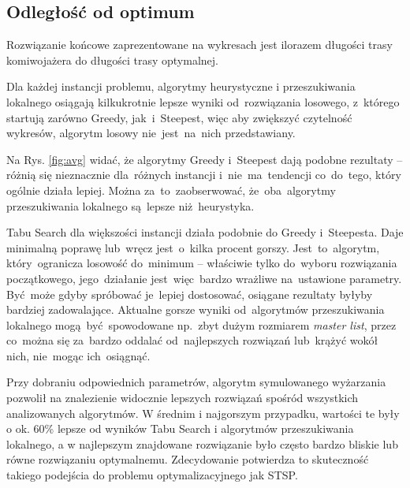 \subsection{Odległość od optimum}

{\color{part2}
Rozwiązanie końcowe zaprezentowane na wykresach jest ilorazem długości trasy komiwojażera do długości trasy optymalnej.

Dla każdej instancji problemu, algorytmy heurystyczne i przeszukiwania lokalnego osiągają kilkukrotnie lepsze wyniki od~rozwiązania losowego, z~którego startują zarówno Greedy, jak~i~Steepest, więc aby zwiększyć czytelność wykresów, algorytm losowy nie~jest~na~nich przedstawiany.}

Na Rys. \ref{fig:avg} widać, że algorytmy Greedy i~Steepest dają podobne rezultaty -- różnią się nieznacznie dla~różnych instancji i~nie~ma~tendencji co~do~tego, który ogólnie działa lepiej. Można za~to~zaobserwować, że~oba~algorytmy przeszukiwania lokalnego są~lepsze niż~heurystyka.

{\color{part2}
Tabu Search dla większości instancji działa podobnie do Greedy i~Steepesta. Daje minimalną poprawę lub~wręcz jest~o~kilka procent gorszy. Jest~to~algorytm, który~ogranicza losowość do~minimum -- właściwie tylko do~wyboru rozwiązania początkowego, jego~działanie jest~więc~bardzo wrażliwe na~ustawione parametry. Być~może gdyby spróbować je~lepiej dostosować, osiągane rezultaty byłyby bardziej zadowalające. Aktualne gorsze wyniki od~algorytmów przeszukiwania lokalnego mogą~być~spowodowane np.~zbyt dużym rozmiarem \textit{master list}, przez co~można się za~bardzo oddalać od~najlepszych rozwiązań lub~krążyć wokół nich, nie~mogąc ich~osiągnąć.

Przy dobraniu odpowiednich parametrów, algorytm symulowanego wyżarzania pozwolił na znalezienie widocznie lepszych rozwiązań spośród wszystkich analizowanych algorytmów. W średnim i najgorszym przypadku, wartości te były o ok. 60\% lepsze od wyników Tabu Search i algorytmów przeszukiwania lokalnego, a w najlepszym znajdowane rozwiązanie było często bardzo bliskie lub równe rozwiązaniu optymalnemu. Zdecydowanie potwierdza to skuteczność takiego podejścia do problemu optymalizacyjnego jak STSP.
}

